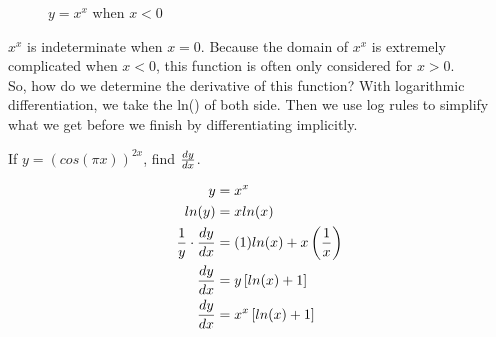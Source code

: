 \begin{exercise}
    \begin{figure}[H]
        \centering
        \caption{$ y = x ^ x $ when $ x < 0 $}
    \end{figure}
\end{exercise}

$ x^x $ is indeterminate when $ x = 0 $. Because the domain of $ x^x $ is extremely complicated when $ x < 0 $, this function is often only considered for $ x > 0 $. \\

So, how do we determine the derivative of this function? With logarithmic differentiation, we take the ln() of both side. Then we use log rules to simplify what we get before we finish by differentiating implicitly. \\

\begin{exercise}\nonumber
    If $ y = (cos(\pi x))^{2x} $, find $  dy \over dx $.

    \begin{align}
        y                               & = x^x                                  \\
        ln(y)                           & = xln(x)                               \\
        {1 \over y} \cdot {dy \over dx} & = (1)ln(x) + x\left({1 \over x}\right) \\
        {dy \over dx}                   & = y\left[ln(x) + 1\right]              \\
        {dy \over dx}                   & = x^x\left[ln(x) + 1\right]
    \end{align}
\end{exercise}

